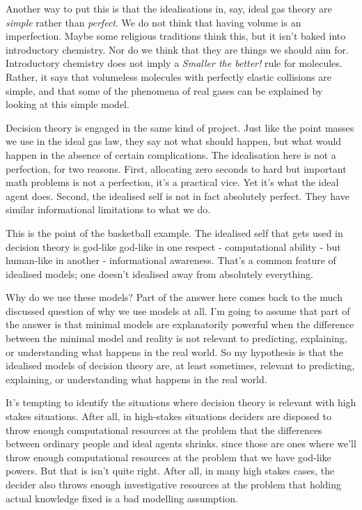 \documentclass[
  10pt,
  letterpaper,
  DIV=11,
  numbers=noendperiod,
  twoside]{scrartcl}
\begin{document}
Another way to put this is that the idealisations in, say, ideal gas
theory are \emph{simple} rather than \emph{perfect}. We do not think
that having volume is an imperfection. Maybe some religious traditions
think this, but it isn't baked into introductory chemistry. Nor do we
think that they are things we should aim for. Introductory chemistry
does not imply a \emph{Smaller the better!} rule for molecules. Rather,
it says that volumeless molecules with perfectly elastic collisions are
simple, and that some of the phenomena of real gases can be explained by
looking at this simple model.

Decision theory is engaged in the same kind of project. Just like the
point masses we use in the ideal gas law, they say not what should
happen, but what would happen in the absence of certain complications.
The idealisation here is not a perfection, for two reasons. First,
allocating zero seconds to hard but important math problems is not a
perfection, it's a practical vice. Yet it's what the ideal agent does.
Second, the idealised self is not in fact absolutely perfect. They have
similar informational limitations to what we do.

This is the point of the basketball example. The idealised self that
gets used in decision theory is god-like god-like in one respect -
computational ability - but human-like in another - informational
awareness. That's a common feature of idealised models; one doesn't
idealised away from absolutely everything.

Why do we use these models? Part of the answer here comes back to the
much discussed question of why we use models at all. I'm going to assume
that part of the answer is that minimal models are explanatorily
powerful when the difference between the minimal model and reality is
not relevant to predicting, explaining, or understanding what happens in
the real world. So my hypothesis is that the idealised models of
decision theory are, at least sometimes, relevant to predicting,
explaining, or understanding what happens in the real world.

It's tempting to identify the situations where decision theory is
relevant with high stakes situations. After all, in high-stakes
situations deciders are disposed to throw enough computational resources
at the problem that the differences between ordinary people and ideal
agents shrinks. since those are ones where we'll throw enough
computational resources at the problem that we have god-like powers. But
that is isn't quite right. After all, in many high stakes cases, the
decider also throws enough investigative resources at the problem that
holding actual knowledge fixed is a bad modelling assumption.
\end{document}
